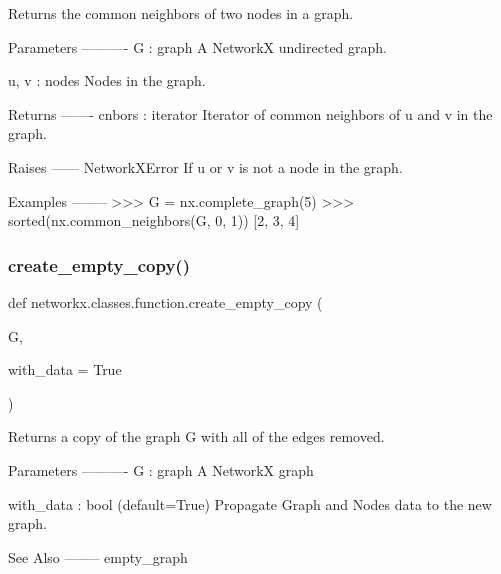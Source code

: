 \begin{DoxyVerb}Returns the common neighbors of two nodes in a graph.

Parameters
----------
G : graph
    A NetworkX undirected graph.

u, v : nodes
    Nodes in the graph.

Returns
-------
cnbors : iterator
    Iterator of common neighbors of u and v in the graph.

Raises
------
NetworkXError
    If u or v is not a node in the graph.

Examples
--------
>>> G = nx.complete_graph(5)
>>> sorted(nx.common_neighbors(G, 0, 1))
[2, 3, 4]
\end{DoxyVerb}
 \mbox{\label{namespacenetworkx_1_1classes_1_1function_a565df0c79563c4cde9f996730f69b6d8}} 
\subsubsection{\texorpdfstring{create\+\_\+empty\+\_\+copy()}{create\_empty\_copy()}}
{\footnotesize\ttfamily def networkx.\+classes.\+function.\+create\+\_\+empty\+\_\+copy (\begin{DoxyParamCaption}\item[{}]{G,  }\item[{}]{with\+\_\+data = {\ttfamily True} }\end{DoxyParamCaption})}

\begin{DoxyVerb}Returns a copy of the graph G with all of the edges removed.

Parameters
----------
G : graph
   A NetworkX graph

with_data :  bool (default=True)
   Propagate Graph and Nodes data to the new graph.

See Also
--------
empty_graph\end{DoxyVerb}
 \mbox{\label{namespacenetworkx_1_1classes_1_1function_ab0d09e12435fd33c5f6915608df6fbf3}} 
